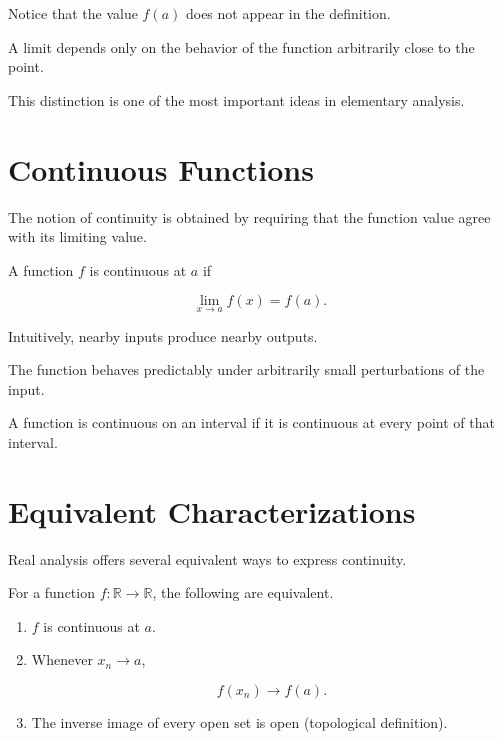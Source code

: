 \documentclass{essay}
\begin{document}
Notice that the value \(f(a)\) does not appear in the definition.

A limit depends only on the behavior of the function arbitrarily close to the
point.

This distinction is one of the most important ideas in elementary analysis.


\section{Continuous Functions}

The notion of continuity is obtained by requiring that the function value agree
with its limiting value.

\begin{definition}

A function \(f\) is continuous at \(a\) if

\[
\lim_{x\to a}f(x)=f(a).
\]

\end{definition}

Intuitively, nearby inputs produce nearby outputs.

The function behaves predictably under arbitrarily small perturbations of the
input.

\begin{definition}

A function is continuous on an interval if it is continuous at every point of
that interval.

\end{definition}


\section{Equivalent Characterizations}

Real analysis offers several equivalent ways to express continuity.

\begin{theorem}

For a function \(f:\mathbb{R}\rightarrow\mathbb{R}\), the following are
equivalent.

\begin{enumerate}
\item \(f\) is continuous at \(a\).

\item Whenever \(x_n\to a\),

\[
f(x_n)\to f(a).
\]

\item The inverse image of every open set is open (topological definition).

\end{enumerate}

\end{theorem}
\end{document}
